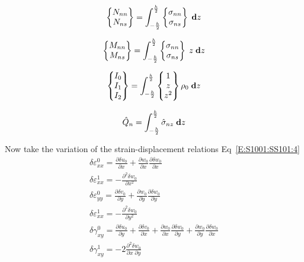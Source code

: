 \documentclass[11pt,letterpaper,titlepage,draft]{article}
\newcommand{\diff}{\textbf d}
\newcommand{\PDer}[2]{\frac{\partial #1}{\partial #2}}
\newcommand{\PPDer}[2]{\frac{\partial^2 #1}{\partial #2^2}}
\newcommand{\PPDerMix}[3]{\frac{\partial^2 #1}{\partial #2\; \partial #3}}
\numberwithin{equation}{subsection}
\begin{document}
\begin{equation}\label{E:S1001:SS102:10}
\begin{Bmatrix}
N_{nn}\\
N_{ns}
\end{Bmatrix}
 = 
\int_{-\frac{h}{2}}^{\frac{h}{2}}
\begin{Bmatrix}
\sigma_{nn}\\
\sigma_{ns}
\end{Bmatrix}
\; \diff{z}
\end{equation}

\begin{equation}\label{E:S1001:SS102:11}
\begin{Bmatrix}
M_{nn}\\
M_{ns}
\end{Bmatrix}
 = 
\int_{-\frac{h}{2}}^{\frac{h}{2}}
\begin{Bmatrix}
\sigma_{nn}\\
\sigma_{ns}
\end{Bmatrix}
\; z\; \diff{z}
\end{equation}


\begin{equation}\label{E:S1001:SS102:12}
\begin{Bmatrix}
I_0\\
I_1\\
I_2
\end{Bmatrix}
 = 
\int_{-\frac{h}{2}}^{\frac{h}{2}}
\begin{Bmatrix}
1\\
z\\
z^2
\end{Bmatrix}
\rho_0\; \diff{z}
\end{equation}

\begin{equation}\label{E:S1001:SS102:13}
\hat{Q}_n = \int_{-\frac{h}{2}}^{\frac{h}{2}} \hat{\sigma}_{nz}\; \diff{z}
\end{equation}

Now take the variation of the strain-displacement relations 
Eq~\ref{E:S1001:SS101:4}
\begin{gather}\label{E:S1001:SS102:14}
\delta \varepsilon_{xx}^{0} = \PDer{\delta u_0}{x} + \PDer{w_0}{x}\PDer{\delta w_0}{x}
\\
\delta \varepsilon_{xx}^{1} = -\PPDer{\delta w_0}{x} 
\\
\delta \varepsilon_{yy}^{0} = \PDer{\delta v_0}{y} + \PDer{w_0}{y}\PDer{\delta w_0}{y}
\\
\delta \varepsilon_{xx}^{1} = -\PPDer{\delta w_0}{y} 
\\
\delta \gamma_{xy}^{0} = \PDer{\delta u_0}{y} +\PDer{\delta v_0}{x} +  \PDer{w_0}{x}\PDer{\delta w_0}{y} +  \PDer{w_0}{y}\PDer{\delta w_0}{x}
\\
\delta \gamma_{xy}^{1} = -2 \PPDerMix{\delta w_0}{x}{y} 
\end{gather}
\end{document}
